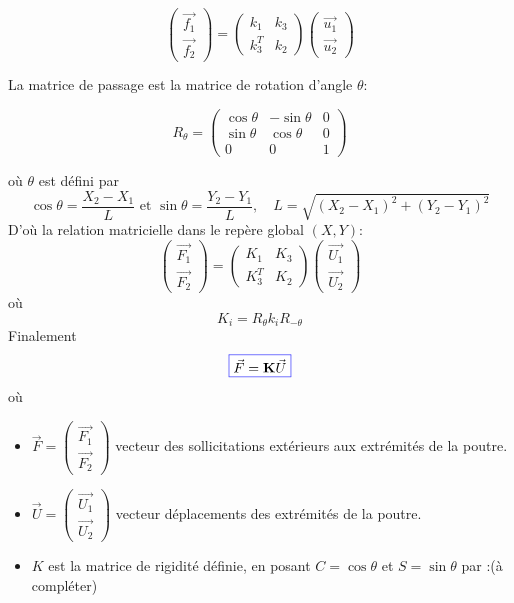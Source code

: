 \documentclass[a4paper]{article}
\newcommand{\myredbox}[1]{\fcolorbox{blue}{white}{$\displaystyle#1$}}
\begin{document}
\[\left(\begin{array}{l} 
\vec{f_{1}}\\\vec{f_{2}}
\end{array}\right) = \left(\begin{array}{rr} 
k_1&k_3\\
k_3^T&k_2
\end{array}\right) \left(\begin{array}{l} 
\vec{u_{1}}\\\vec{u_{2}}
\end{array}\right)   \]


La matrice de passage est la matrice de rotation d'angle $\theta$:

\[
R_{\theta}=\left(\begin{array}{rrr} 
\cos \theta&-\sin \theta &0\\
\sin \theta&\cos \theta&0\\
0&0&1
\end{array}\right)
\]

où $\theta$ est défini par
\[\cos \theta = \frac{X_2-X_1}{L}\mbox{ et }\sin \theta = \frac{Y_2-Y_1}{L},\quad L=\sqrt{(X_2-X_1)^2+(Y_2-Y_1)^2} \]
D'où la relation matricielle dans le repère global $(X,Y)$:
\[\left(\begin{array}{l} 
\vec{F_{1}}\\\vec{F_{2}}
\end{array}\right) = \left(\begin{array}{rr} 
K_1&K_3\\
K_3^T&K_2
\end{array}\right) \left(\begin{array}{l} 
\vec{U_{1}}\\\vec{U_{2}}
\end{array}\right)  \]
où 
\[ K_i=R_{\theta}k_iR_{-\theta}\]
Finalement
\[\myredbox{\vec{F}= \mbox{\textbf{K}} \vec{U} }\]
où
\begin{itemize}
\item $\vec{F}=\left(\begin{array}{l} 
\vec{F_{1}}\\\vec{F_{2}}
\end{array}\right)$ vecteur des sollicitations extérieurs aux extrémités de la poutre.
\item $\vec{U}=\left(\begin{array}{l} 
\vec{U_{1}}\\\vec{U_{2}}
\end{array}\right)$ vecteur déplacements des extrémités de la poutre.
\item $K$ est la matrice de rigidité définie, en posant $C=\cos\theta$ et $S=\sin\theta$ par :(à compléter)

\end{itemize}
\end{document}
